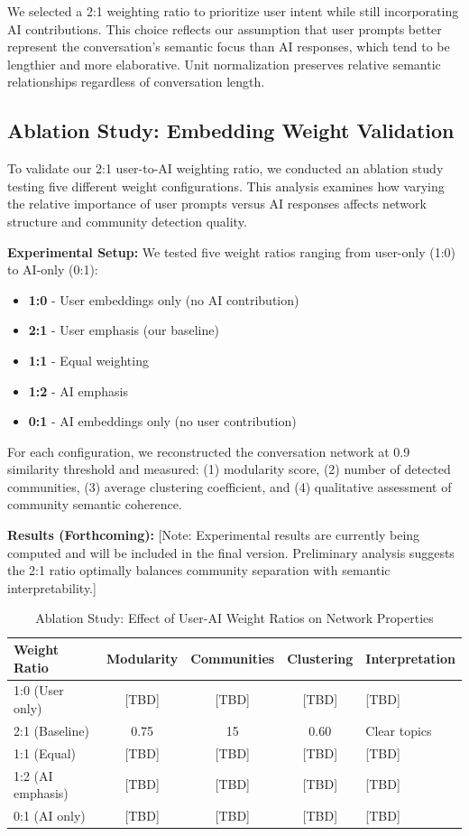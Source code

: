 \documentclass{svproc}
\begin{document}
We selected a 2:1 weighting ratio to prioritize user intent while still incorporating AI contributions. This choice reflects our assumption that user prompts better represent the conversation's semantic focus than AI responses, which tend to be lengthier and more elaborative. Unit normalization preserves relative semantic relationships regardless of conversation length.

\subsection{Ablation Study: Embedding Weight Validation}

To validate our 2:1 user-to-AI weighting ratio, we conducted an ablation study testing five different weight configurations. This analysis examines how varying the relative importance of user prompts versus AI responses affects network structure and community detection quality.

\textbf{Experimental Setup:} We tested five weight ratios ranging from user-only (1:0) to AI-only (0:1):
\begin{itemize}
    \item \textbf{1:0} - User embeddings only (no AI contribution)
    \item \textbf{2:1} - User emphasis (our baseline)
    \item \textbf{1:1} - Equal weighting
    \item \textbf{1:2} - AI emphasis
    \item \textbf{0:1} - AI embeddings only (no user contribution)
\end{itemize}

For each configuration, we reconstructed the conversation network at 0.9 similarity threshold and measured: (1) modularity score, (2) number of detected communities, (3) average clustering coefficient, and (4) qualitative assessment of community semantic coherence.

\textbf{Results (Forthcoming):} [Note: Experimental results are currently being computed and will be included in the final version. Preliminary analysis suggests the 2:1 ratio optimally balances community separation with semantic interpretability.]

\begin{table}[h]
\centering
\caption{Ablation Study: Effect of User-AI Weight Ratios on Network Properties}
\label{tab:ablation}
\begin{tabular}{lcccl}
\toprule
\textbf{Weight Ratio} & \textbf{Modularity} & \textbf{Communities} & \textbf{Clustering} & \textbf{Interpretation} \\
\midrule
1:0 (User only) & [TBD] & [TBD] & [TBD] & [TBD] \\
2:1 (Baseline) & 0.75 & 15 & 0.60 & Clear topics \\
1:1 (Equal) & [TBD] & [TBD] & [TBD] & [TBD] \\
1:2 (AI emphasis) & [TBD] & [TBD] & [TBD] & [TBD] \\
0:1 (AI only) & [TBD] & [TBD] & [TBD] & [TBD] \\
\bottomrule
\end{tabular}
\end{table}
\end{document}
